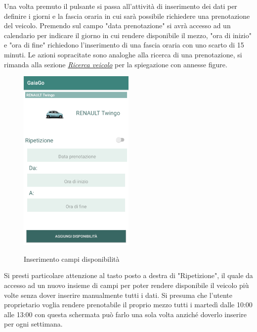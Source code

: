 Una volta premuto il pulsante si passa all'attività di inserimento dei dati per definire i giorni e la fascia oraria in cui sarà possibile richiedere una prenotazione del veicolo. Premendo sul campo "data prenotazione" si avrà accesso ad un calendario per indicare il giorno in cui rendere disponibile il mezzo, "ora di inizio" e "ora di fine" richiedono l'inserimento di una fascia oraria con uno scarto di 15 minuti.
Le azioni sopracitate sono analoghe alla ricerca di una prenotazione, si rimanda alla sezione \textit{\hyperref[sec:hello]{Ricerca veicolo}} per la spiegazione con annesse figure.
 \begin{figure}[H] 
	\centering 
	\includegraphics[width=0.5\textwidth]{res/images/aggiungi_disponibilita2.png}\\
	\caption{Inserimento campi disponibilità}
	\label{campi disponibilità}
\end{figure}
\pagebreak

Si presti particolare attenzione al tasto posto a destra di "Ripetizione", il quale da accesso ad un nuovo insieme di campi per poter rendere disponibile il veicolo più volte senza dover inserire manualmente tutti i dati. Si presuma che l'utente proprietario voglia rendere prenotabile il proprio mezzo tutti i martedì dalle 10:00 alle 13:00 con questa schermata può farlo una sola volta anziché doverlo inserire per ogni settimana.

